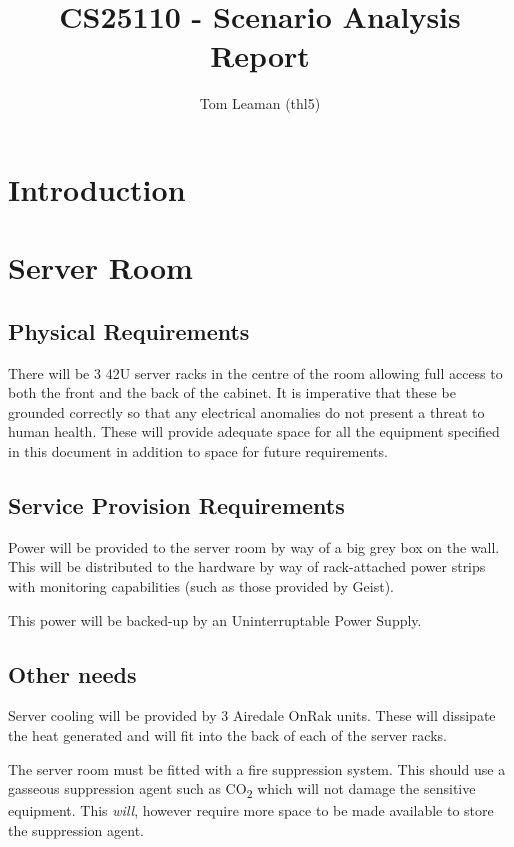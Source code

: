 \documentclass[a4paper, twoside]{article}
\title{CS25110 - Scenario Analysis Report}
\author{Tom Leaman (thl5)}
\begin{document}
\maketitle
\newpage
\tableofcontents
\newpage

\section{Introduction}

\section{Server Room}
\subsection{Physical Requirements}

There will be 3 42U server racks in the centre of the room allowing full access
to both the front and the back of the cabinet. It is imperative that these be
grounded correctly so that any electrical anomalies do not present a threat to
human health. These will provide adequate space for all the equipment specified
in this document in addition to space for future requirements.

\subsection{Service Provision Requirements}
Power will be provided to the server room by way of a big grey box on the wall.
This will be distributed to the hardware by way of rack-attached power strips
with monitoring capabilities (such as those provided by Geist).

This power will be backed-up by an Uninterruptable Power Supply. %


\subsection{Other needs}
Server cooling will be provided by 3 Airedale OnRak units. These will dissipate
the heat generated and will fit into the back of each of the server racks.

The server room must be fitted with a fire suppression system. This should use a
gasseous suppression agent such as CO\textsubscript{2} which will not damage the
sensitive equipment. This \emph{will}, however require more space to be made
available to store the suppression agent.
\end{document}
